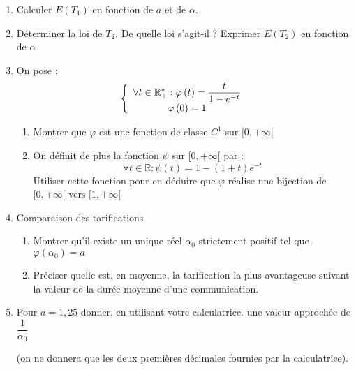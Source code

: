 \documentclass[a4paper, 11pt,reqno]{article}
\begin{document}
\begin{enumerate}
\item Calculer $E(T_{1})$ en fonction de $a$ et de $\alpha $.

\item Déterminer la loi de $T_{2}$. De quelle loi s'agit-il ? Exprimer $%
E(T_{2})$ en fonction de $\alpha $

\item On pose : 
\begin{equation*}
\left\{ 
\begin{array}{c}
\forall t\in \mathbb{R}_{+}^{\ast }:\varphi \left( t\right) =\dfrac{t}{%
1-e^{-t}} \\ 
\varphi \left( 0\right) =1%
\end{array}%
\right.
\end{equation*}

\begin{enumerate}
\item Montrer que $\varphi $ est une fonction de classe $C^{1}$ sur $%
[0,+\infty \lbrack $

\item On définit de plus la fonction $\psi $ sur $[0,+\infty \lbrack $ par : 
\begin{equation*}
\forall t\in \mathbb{R}:\psi \left( t\right) =1-\left( 1+t\right) e^{-t}
\end{equation*}%
Utiliser cette fonction pour en déduire que $\varphi $ réalise une bijection
de$[0,+\infty \lbrack $ vers $[1,+\infty \lbrack $
\end{enumerate}

\item Comparaison des tarifications

\begin{enumerate}
\item Montrer qu'il existe un unique réel $\alpha _{0}$ strictement positif
tel que $\varphi \left( \alpha _{0}\right) =a$

\item Préciser quelle est, en moyenne, la tarification la plus avantageuse
suivant la valeur de la durée moyenne d'une communication.
\end{enumerate}

\item Pour $a=1,25$ donner, en utilisant votre calculatrice. une valeur
approchée de $\dfrac{1}{\alpha _{0}}$

(on ne donnera que les deux premières décimales fournies par la
calculatrice).
\end{enumerate}
\end{document}

